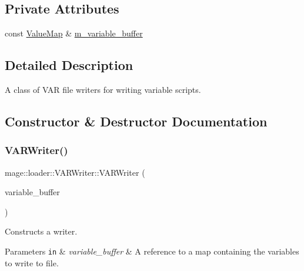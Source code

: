 \subsection*{Private Attributes}
\begin{DoxyCompactItemize}
\item 
const \mbox{\hyperlink{namespacemage_a3a4b59e486babe3ec78455f9ee0d4beb}{Value\+Map}} \& \mbox{\hyperlink{classmage_1_1loader_1_1_v_a_r_writer_a45192c85b24355c848e16aa813ea226f}{m\+\_\+variable\+\_\+buffer}}
\end{DoxyCompactItemize}


\subsection{Detailed Description}
A class of V\+AR file writers for writing variable scripts. 

\subsection{Constructor \& Destructor Documentation}
\mbox{\label{classmage_1_1loader_1_1_v_a_r_writer_a1b08fd8f57b0822550851bcb7f380cdb}} 
\subsubsection{\texorpdfstring{V\+A\+R\+Writer()}{VARWriter()}\hspace{0.1cm}{\footnotesize\ttfamily [1/3]}}
{\footnotesize\ttfamily mage\+::loader\+::\+V\+A\+R\+Writer\+::\+V\+A\+R\+Writer (\begin{DoxyParamCaption}\item[{const \mbox{\hyperlink{namespacemage_a3a4b59e486babe3ec78455f9ee0d4beb}{Value\+Map}} \&}]{variable\+\_\+buffer }\end{DoxyParamCaption})\hspace{0.3cm}{\ttfamily [explicit]}}

Constructs a writer.


\begin{DoxyParams}[1]{Parameters}
\mbox{\tt in}  & {\em variable\+\_\+buffer} & A reference to a map containing the variables to write to file. \\
\hline
\end{DoxyParams}
\mbox{\label{classmage_1_1loader_1_1_v_a_r_writer_a5ddb3fcd75952ecc8593bc284dc3db0e}} 

